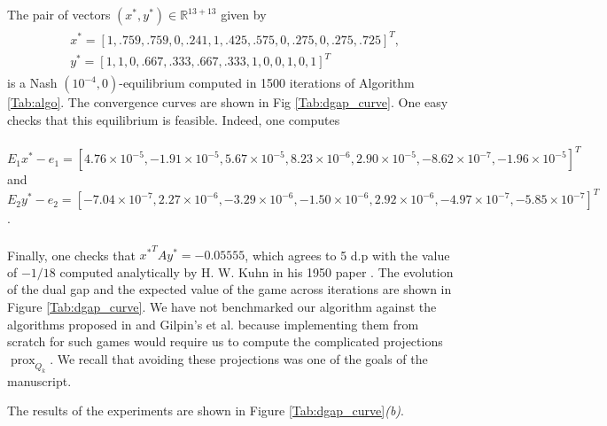 \documentclass[a4paper,9pt]{extarticle}
\DeclareMathOperator{\prox}{prox}
\begin{document}
The pair of vectors $(x^*, y^*) \in \mathbb{R}^{13 + 13}$ given by
\begin{eqnarray*}
  \begin{split}
    &x^* = [1, .759, .759, 0, .241, 1, .425, .575, 0, .275, 0,
      .275, .725]^T,\\
    &y^* = [1, 1, 0, .667, .333, .667, .333, 1, 0, 0, 1, 0, 1]^T
    \end{split}
\end{eqnarray*}
is a Nash $(10^{-4},0)$-equilibrium computed in 1500 iterations of
Algorithm  \ref{Tab:algo}. The convergence curves are shown
in Fig \ref{Tab:dgap_curve}. One easy checks that this equilibrium is
feasible. Indeed, one computes \\\\
$E_1x^* - e_1 = [4.76 \times 10^{-5}, -1.91 \times 10^{-5}, 5.67
      \times 10^{-5}, 8.23 \times 10^{-6}, 2.90 \times 10^{-5},
      -8.62 \times 10^{-7}, -1.96 \times 10^{-5}]^T$
and
$E_2y^* - e_2 = [-7.04 \times 10^{-7}, 2.27 \times 10^{-6}, -3.29
  \times 10^{-6}, -1.50 \times 10^{-6},
      2.92 \times 10^{-6}, -4.97 \times 10^{-7}, -5.85 \times
      10^{-7}]^T$.\\\\
Finally, one checks that ${x^*}^TAy^* = {-0.05555}$,
 which agrees to 5 d.p with the value of $-1 / 18$ computed
 analytically by H. W. Kuhn in his 1950 paper \cite{kuhn}. The
 evolution of the dual gap and the expected value of
 the game across iterations are shown in Figure \ref{Tab:dgap_curve}.
We have not benchmarked our algorithm against the algorithms proposed in
\cite{nesterov2005a} and Gilpin's et al. \cite{gilpinfirst} because
implementing them from scratch for such games would require us to
compute the complicated projections $\prox_{Q_k}$. We recall that
avoiding these projections was one of the goals of the manuscript.

The results of the experiments are shown in Figure
\ref{Tab:dgap_curve}\textit{(b)}.
\end{document}
